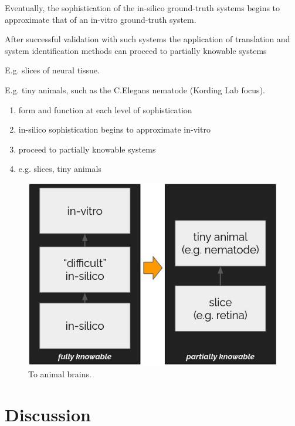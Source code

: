 \documentclass{ldr-article}
\begin{document}
Eventually, the sophistication of the in-silico ground-truth systems begins to approximate that of an in-vitro ground-truth system.

After successful validation with such systems the application of translation and system identification methods can proceed to partially knowable systems

E.g. slices of neural tissue.

E.g. tiny animals, such as the C.Elegans nematode (Kording Lab focus).

\begin{enumerate}
	\item form and function at each level of sophistication
	\item in-silico sophistication begins to approximate in-vitro
	\item proceed to partially knowable systems
	\item e.g. slices, tiny animals
\end{enumerate}

\begin{figure}
	\centering
	\includegraphics[width=1\linewidth]{figures/to-animal-brains.jpg}
	\caption{To animal brains.}
	\label{fig:to-animal-brains}
\end{figure}


\section{Discussion}


\printbibliography
\end{document}
